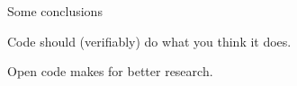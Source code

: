 \documentclass{beamer}
\begin{document}
    \begin{frame}
        \Huge
        \begin{center}
            Some conclusions
        \end{center}
    \end{frame}

    \begin{frame}
        \Huge
        \begin{center}
            Code should (verifiably) do what you think it does.
        \end{center}
    \end{frame}

    \begin{frame}
        \Huge
        \begin{center}
            Open code makes for better research.
        \end{center}
    \end{frame}
\end{document}
